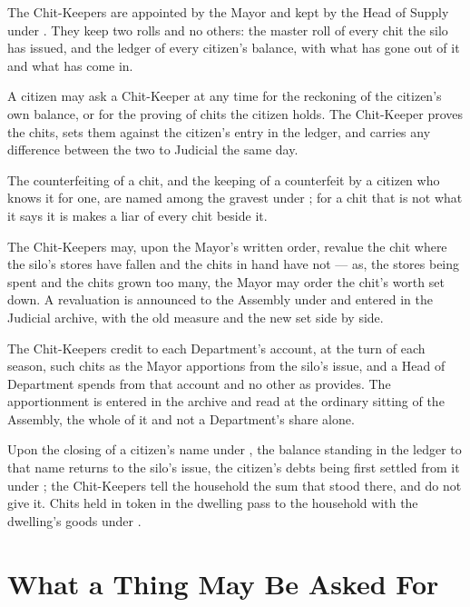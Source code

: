 \begin{clauses}
\item The Chit-Keepers are appointed by the Mayor and kept by the Head of Supply under . They keep two rolls and no others: the master roll of every chit the silo has issued, and the ledger of every citizen's balance, with what has gone out of it and what has come in.
\item A citizen may ask a Chit-Keeper at any time for the reckoning of the citizen's own balance, or for the proving of chits the citizen holds. The Chit-Keeper proves the chits, sets them against the citizen's entry in the ledger, and carries any difference between the two to Judicial the same day.
\item The counterfeiting of a chit, and the keeping of a counterfeit by a citizen who knows it for one, are named among the gravest under ; for a chit that is not what it says it is makes a liar of every chit beside it.
\item The Chit-Keepers may, upon the Mayor's written order, revalue the chit where the silo's stores have fallen and the chits in hand have not --- as, the stores being spent and the chits grown too many, the Mayor may order the chit's worth set down. A revaluation is announced to the Assembly under  and entered in the Judicial archive, with the old measure and the new set side by side.
\item The Chit-Keepers credit to each Department's account, at the turn of each season, such chits as the Mayor apportions from the silo's issue, and a Head of Department spends from that account and no other as  provides. The apportionment is entered in the archive and read at the ordinary sitting of the Assembly, the whole of it and not a Department's share alone.
\item Upon the closing of a citizen's name under , the balance standing in the ledger to that name returns to the silo's issue, the citizen's debts being first settled from it under ; the Chit-Keepers tell the household the sum that stood there, and do not give it. Chits held in token in the dwelling pass to the household with the dwelling's goods under .
\end{clauses}

\section{What a Thing May Be Asked For}
\label{sec:commerce:what-a-thing-may-be-asked-for}

